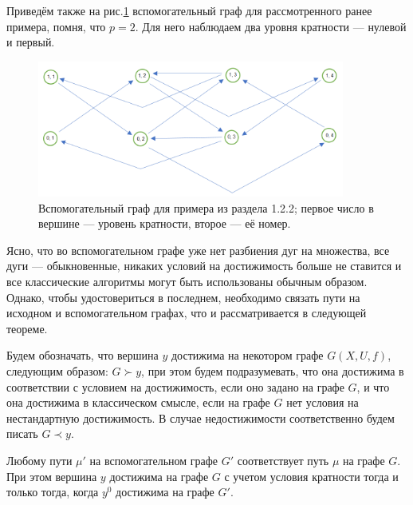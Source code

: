 Приведём также на рис.\ref{fig:pic_3} вспомогательный граф для рассмотренного ранее примера, помня, что $p = 2$. Для него наблюдаем два уровня кратности --- нулевой и первый.

\begin{figure}
	\centering
	{\includegraphics[width=0.9\textwidth]{img/33.png}}
	{Вспомогательный граф для примера из раздела 1.2.2; первое число в вершине --- уровень кратности, второе --- её номер.}
	\label{fig:pic_3}
\end{figure}

Ясно, что во вспомогательном графе уже нет разбиения дуг на множества, все дуги --- обыкновенные, никаких условий на достижимость больше не ставится и все классические алгоритмы могут быть использованы обычным образом. Однако, чтобы удостовериться в последнем, необходимо связать пути на исходном и вспомогательном графах, что и рассматривается в следующей теореме. 

\begin{definition}
	Будем обозначать, что вершина $y$ достижима на некотором графе $G(X,U,f)$, следующим образом: $G \succ y$, при этом будем подразумевать, что она достижима в соответствии с условием на достижимость, если оно задано на графе $G$, и что она достижима в классическом смысле, если на графе $G$ нет условия на нестандартную достижимость.
	В случае недостижимости соответственно будем писать $G \prec y$.
\end{definition}

\begin{theorem}
	Любому пути $\mu'$ на вспомогательном графе $G'$ соответствует путь $\mu$ на графе $G$. При этом вершина $y$ достижима на графе $G$ с учетом условия кратности тогда и только тогда, когда $y^0$ достижима на графе $G'$. 
\end{theorem}

